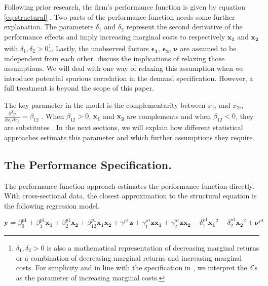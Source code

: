 \documentclass[12pt]{article}
\begin{document}
Following prior research, the firm's performance function is given by
equation \eqref{eq:structural} \citep{Gentzkow2007, Kretschmer2012}. Two
parts of the performance function needs some further explanation. The
parameters \(\delta_1\) and \(\delta_2\) represent the second derivative
of the performance effects and imply increasing marginal costs to
respectively \(\mathbf{x_1}\) and \(\mathbf{x_2}\) with
\(\delta_1, \delta_2 > 0\)\footnote{\(\delta_1, \delta_2 > 0\) is also a
  mathematical representation of decreasing marginal returns or a
  combination of decreasing marginal returns and increasing marginal
  costs. For simplicity and in line with the specification in
  \citet{Grabner2013}, we interpret the \(\delta\)'s as the parameter of
  increasing marginal costs.}. Lastly, the unobserved factors
\(\mathbf{\epsilon_{1}}\), \(\mathbf{\epsilon_{2}}\), \(\mathbf{\nu}\)
are assumed to be independent from each other. \citet{Athey1998} discuss
the implications of relaxing those assumptions. We will deal with one
way of relaxing this assumption when we introduce potential spurious
correlation in the demand specification. However, a full treatment is
beyond the scope of this paper.

The key parameter in the model is the complementarity between \(x_{1i}\)
and \(x_{2i}\),
\(\frac{ \partial^2 y}{\partial x_1 \partial x_2} = \beta_{12}\) . When
\(\beta_{12} > 0\), \(\mathbf{x_1}\) and \(\mathbf{x_2}\) are
complements and when \(\beta_{12} < 0\), they are substitutes
\citep{Milgrom1995}. In the next sections, we will explain how different
statistical approaches estimate this parameter and which further
assumptions they require.

\subsection{The Performance
Specification.}\label{the-performance-specification.}

The performance function approach estimates the performance function
directly. With cross-sectional data, the closest approximation to the
structural equation is the following regression model.

\[
\mathbf{y} = \beta^{p1}_0 + \beta^{p1}_1 \mathbf{x_1} + \beta^{p1}_2 \mathbf{x_2}
  + \beta^{p1}_{12} \mathbf{x_1} \mathbf{x_2} + \gamma^{p1} \mathbf{z} +
  \gamma^{p1}_{1} \mathbf{z} \mathbf{x_1} +
  \gamma^{p1}_{2} \mathbf{z} \mathbf{x_2} -
  \delta^{p1}_1 \mathbf{x_1}^2 - \delta^{p1}_2 \mathbf{x_2}^2  +
  \mathbf{\nu}^{p1}
\]
\end{document}
